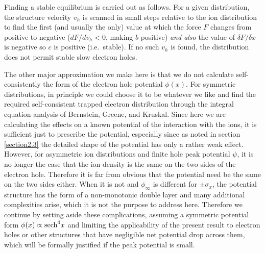 \documentclass[12pt]{article}
\begin{document}
Finding a stable equilibrium is carried out as follows.  For a given
distribution, the structure velocity $v_h$ is scanned in small steps
relative to the ion distribution to find the first (and usually the
only) value at which the force $F$ changes from positive to negative
($dF/dv_h<0$, making $b$ positive) \emph{and also} the value of
$\delta F/\delta x$ is negative so $c$ is positive (i.e.\ stable). If
no such $v_h$ is found, the distribution does not permit stable slow
electron holes. 

The other major approximation we make here is that we do not calculate
self-consistently the form of the electron hole potential
$\phi(x)$. For symmetric distributions, in principle we could choose
it to be whatever we like and find the required self-consistent
trapped electron distribution through the integral equation analysis
of Bernstein, Greene, and Kruskal\cite{Bernstein1957,Hutchinson2017}. Since here we
are calculating the effects on a known potential of the interaction
with the ions, it is sufficient just to prescribe the potential,
especially since as noted in section \ref{section2.3} the detailed
shape of the potential has only a rather weak effect. However, for
asymmetric ion distributions and finite hole peak potential $\psi$, it
is no longer the case that the ion density is the same on the two
sides of the electron hole. Therefore it is far from obvious that the
potential need be the same on the two sides either. When it is not and
$\phi_\infty$ is different for $\pm\sigma_x$, the potential structure
has the form of a non-monotonic double layer\cite{Raadu1989} and many
additional complexities arise, which it is not the purpose to address
here. Therefore we continue by setting aside these complications,
assuming a symmetric potential form $\phi(x)\propto{\rm sech}^4x$ and
limiting the applicability of the present result to electron holes or
other structures that have negligible net potential drop across them,
which will be formally justified if the peak potential is small.
\end{document}
